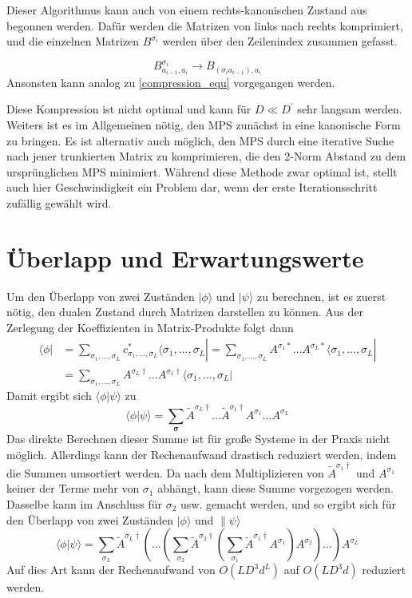 \documentclass[10pt,a4paper]{report}
\newcommand{\SumIndex}{\sigma_1,\ldots,\sigma_L}
\begin{document}
Dieser Algorithmus kann auch von einem rechts-kanonischen Zustand aus begonnen werden. Dafür werden die Matrizen von links nach rechts komprimiert, und die einzelnen Matrizen $B^{\sigma_i}$ werden über den Zeilenindex zusammen gefasst.

\begin{equation}
B_{a_{i-1},a_{i}}^{\sigma_i}\rightarrow B_{(\sigma_i a_{i-1}),a_i}
\end{equation}
Ansonsten kann analog zu \ref{compression_equ} vorgegangen werden.

Diese Kompression ist nicht optimal und kann für $D\ll D^\prime$ sehr langsam werden. Weiters ist es im Allgemeinen nötig, den MPS zunächst in eine kanonische Form zu bringen. Es ist alternativ auch möglich, den MPS durch eine iterative Suche nach jener trunkierten Matrix zu komprimieren, die den 2-Norm Abstand zu dem ursprünglichen MPS minimiert. Während diese Methode zwar optimal ist, stellt auch hier Geschwindigkeit ein Problem dar, wenn der erste Iterationsschritt zufällig gewählt wird.

\section{Überlapp und Erwartungswerte}\label{MPO}
Um den Überlapp von zwei Zuständen $|\phi\rangle$ und $|\psi\rangle$ zu berechnen, ist es zuerst nötig, den dualen Zustand durch Matrizen darstellen zu können. Aus der Zerlegung der Koeffizienten in Matrix-Produkte folgt dann
\begin{equation}
\begin{split}
\langle\phi|&=\sum_{\SumIndex}c_{\SumIndex}^{\ast}\langle\SumIndex|=\sum_{\SumIndex} A^{\sigma_1\ast}\ldots A^{\sigma_L \ast}\langle\SumIndex|\\
 &= \sum_{\SumIndex}A^{\sigma_L\dagger}\ldots A^{\sigma_1 \dagger}\langle\SumIndex|
\end{split}
\end{equation}
Damit ergibt sich $\langle\phi|\psi\rangle$ zu 
\begin{equation}
\langle\phi|\psi\rangle=\sum_{\bm{\sigma}}\tilde{A}^{\sigma_L \dagger}\ldots\tilde{A}^{\sigma_1 \dagger} A^{\sigma_1}\ldots A^{\sigma_L} 
\end{equation}
Das direkte Berechnen dieser Summe ist für große Systeme in der Praxis nicht möglich. Allerdings kann der Rechenaufwand drastisch reduziert werden, indem die Summen umsortiert werden. Da nach dem Multiplizieren von $\tilde{A}^{\sigma_1\dagger}$ und $A^{\sigma_1}$ keiner der Terme mehr von $\sigma_1$ abhängt, kann diese Summe vorgezogen werden. Dasselbe kann im Anschluss für $\sigma_2$ usw. gemacht werden, und so ergibt sich für den Überlapp von zwei Zuständen $|\phi\rangle$ und $\|\psi\rangle$
\begin{equation}
\langle\phi|\psi\rangle=\sum_{\sigma_L}\tilde{A}^{\sigma_L\dagger}(\ldots(\sum_{\sigma_2}\tilde{A}^{\sigma_2\dagger}(\sum_{\sigma_1}\tilde{A}^{\sigma_1\dagger}A^{\sigma_1})A^{\sigma_2})\ldots)A^{\sigma_L}
\end{equation}
Auf dies Art kann der Rechenaufwand von $O(LD^3d^L)$ auf $O(LD^3d)$ reduziert werden.\\
\end{document}
